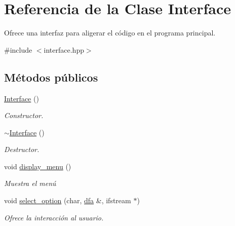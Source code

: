 \hypertarget{class_interface}{}\section{Referencia de la Clase Interface}
\label{class_interface}


Ofrece una interfaz para aligerar el código en el programa principal.  




{\ttfamily \#include $<$interface.\+hpp$>$}

\subsection*{Métodos públicos}
\begin{DoxyCompactItemize}
\item 
\hypertarget{class_interface_a4406d74c75bdfe150bf72be1f1cda8b1}{}\hyperlink{class_interface_a4406d74c75bdfe150bf72be1f1cda8b1}{Interface} ()\label{class_interface_a4406d74c75bdfe150bf72be1f1cda8b1}

\begin{DoxyCompactList}\small\item\em Constructor. \end{DoxyCompactList}\item 
\hypertarget{class_interface_a19179888f29f18f1be54a3dfe98f68c0}{}\hyperlink{class_interface_a19179888f29f18f1be54a3dfe98f68c0}{$\sim$\+Interface} ()\label{class_interface_a19179888f29f18f1be54a3dfe98f68c0}

\begin{DoxyCompactList}\small\item\em Destructor. \end{DoxyCompactList}\item 
\hypertarget{class_interface_a7512767311df1e29287bbc097d7b43c1}{}void \hyperlink{class_interface_a7512767311df1e29287bbc097d7b43c1}{display\+\_\+menu} ()\label{class_interface_a7512767311df1e29287bbc097d7b43c1}

\begin{DoxyCompactList}\small\item\em Muestra el menú \end{DoxyCompactList}\item 
void \hyperlink{class_interface_a6b924342fcc5448903e1dfea5debbe99}{select\+\_\+option} (char, \hyperlink{classdfa}{dfa} \&, ifstream $\ast$)
\begin{DoxyCompactList}\small\item\em Ofrece la interacción al usuario. \end{DoxyCompactList}\end{DoxyCompactItemize}


